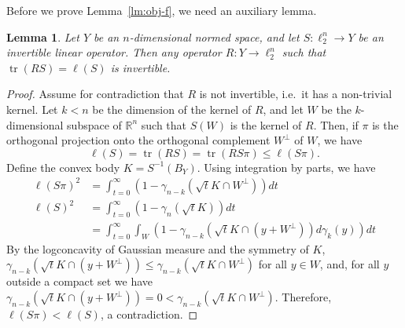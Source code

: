 \documentclass[11pt]{article}
\newtheorem{lemma}[theorem]{Lemma}
\newcommand{\R}{{\mathbb{R}}}
\DeclareMathOperator{\tr}{tr}
\begin{document}
Before we prove Lemma~\ref{lm:obj-f}, we need an auxiliary lemma.
\begin{lemma}\label{lm:invertible}
  Let $Y$ be an $n$-dimensional normed space, and let $S:\ell_2^n \to
  Y$ be an invertible linear operator. Then any operator $R:Y \to
  \ell_2^n$ such that $\tr(RS) = \ell(S)$ is invertible.
\end{lemma}
\begin{proof}
  Assume for contradiction that $R$ is not invertible, i.e.~it has a
  non-trivial kernel. Let $k<n$ be the dimension of the kernel of $R$,
  and let $W$ be the $k$-dimensional subspace of $\R^n$ such that $S(W)$
  is the kernel of $R$. Then, if $\pi$ is the orthogonal projection onto
  the orthogonal complement $W^\perp$ of $W$, we have
  \[
  \ell(S) = \tr(RS) = \tr(RS\pi) \le \ell(S\pi).
  \]
  Define the convex body $K = S^{-1}(B_Y)$. Using integration by
  parts, we have
  \begin{align*}
  \ell(S\pi)^2 &= \int_{t = 0}^\infty (1-\gamma_{n-k}(\sqrt{t}K\cap W^\perp))dt\\
  \ell(S)^2 &= \int_{t = 0}^\infty (1-\gamma_n(\sqrt{t}K))dt\\
  &= \int_{t = 0}^\infty \int_{W}(1-\gamma_{n-k}(\sqrt{t}K \cap (y + W^\perp))d\gamma_{k}(y))dt
  \end{align*}
  By the logconcavity of Gaussian measure and the symmetry of $K$,
  $\gamma_{n-k}(\sqrt{t}K \cap (y + W^\perp)) \le \gamma_{n-k}(\sqrt{t}K \cap
  W^\perp)$ for all $y \in W$, and, for all $y$ outside a
  compact set we have $\gamma_{n-k}(\sqrt{t}K \cap (y + W^\perp)) = 0 <
  \gamma_{n-k}(\sqrt{t}K \cap W^\perp)$. Therefore, $\ell(S\pi) < \ell(S)$, a
  contradiction.
\end{proof}
\end{document}
